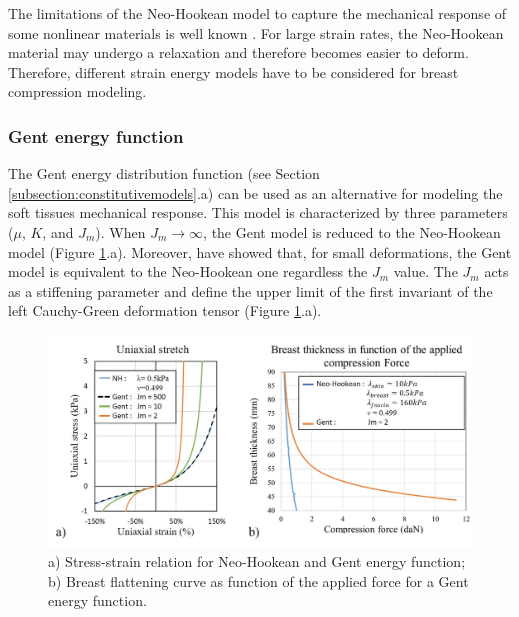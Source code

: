 The limitations of the Neo-Hookean model to capture the mechanical response of some nonlinear materials is well known \citep{kaliske_finite_1997}. For large strain rates, the Neo-Hookean material may undergo a relaxation and therefore becomes easier to deform. Therefore, different strain energy models have to be considered for breast compression modeling.

\subsubsection*{Gent energy function}

The Gent energy distribution function (see Section \ref{subsection:constitutivemodels}.a)  can be used as an alternative for modeling the soft tissues mechanical response. This model is characterized by three parameters ($\mu$, $K$, and $J_m$). When $J_m \longrightarrow \infty$, the Gent model is reduced to the Neo-Hookean model (Figure \ref{fig:GentvsNeoStrain}.a). Moreover,  \citep{chagnon_comparison_2004} have showed that, for small deformations, the Gent model is equivalent to the Neo-Hookean one regardless the $J_m$ value. The $J_m$ acts as a stiffening parameter and define the upper limit of the first invariant of the left Cauchy-Green deformation tensor (Figure \ref{fig:GentvsNeoStrain}.a). 
 
\begin{figure}[!h]
\centering
\includegraphics[width=1\textwidth,keepaspectratio]{figures/GentvsNeoStrain.jpg} 
\caption{a) Stress-strain relation for Neo-Hookean and Gent energy function; b) Breast flattening curve as function of the applied force for a Gent energy function. }
\label{fig:GentvsNeoStrain}
\end{figure}

